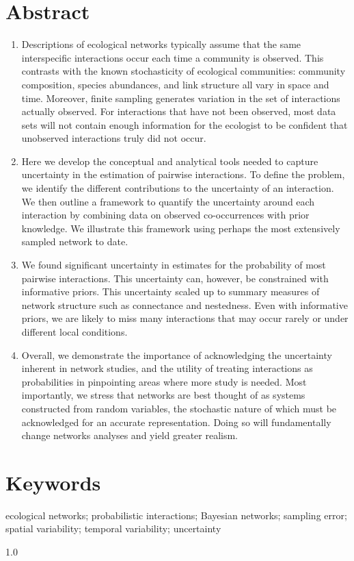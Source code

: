 \documentclass[12pt]{article}
\begin{document}
\begin{spacing}{1.0}

\section*{Abstract}

  \begin{enumerate}

    \item  Descriptions of ecological networks typically assume that the same interspecific interactions occur each time a community is observed. This contrasts with the known stochasticity of ecological communities: community composition, species abundances, and link structure all vary in space and time. Moreover, finite sampling generates variation in the set of interactions actually observed. For interactions that have not been observed, most data sets will not contain enough information for the ecologist to be confident that unobserved interactions truly did not occur.
    \item Here we develop the conceptual and analytical tools needed to capture uncertainty in the estimation of pairwise interactions. To define the problem, we identify the different contributions to the uncertainty of an interaction. We then outline a framework to quantify the uncertainty around each interaction by combining data on observed co-occurrences with prior knowledge. We illustrate this framework using perhaps the most extensively sampled network to date. 
    \item We found significant uncertainty in estimates for the probability of most pairwise interactions. This uncertainty can, however, be constrained with informative priors. This uncertainty scaled up to summary measures of network structure such as connectance and nestedness. Even with informative priors, we are likely to miss many interactions that may occur rarely or under different local conditions. 
    \item Overall, we demonstrate the importance of acknowledging the uncertainty inherent in network studies, and the utility of treating interactions as probabilities in pinpointing areas where more study is needed. Most importantly, we stress that networks are best thought of as systems constructed from random variables, the stochastic nature of which must be acknowledged for an accurate representation. Doing so will fundamentally change networks analyses and yield greater realism.
\end{enumerate}


\section*{\small Keywords}

ecological networks; probabilistic interactions; Bayesian networks; sampling error; spatial variability; temporal variability; uncertainty

\end{spacing}{1.0}
\end{document}
